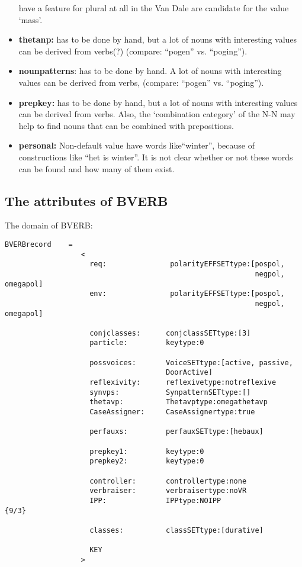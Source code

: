\begin{itemize}
        have a feature for plural at all in the Van Dale are candidate for the 
        value `mass'.
  \item {\bf thetanp:} has to be done by hand, but a lot of nouns with 
        interesting values can be derived from verbs(?) (compare: ``pogen'' vs. 
        ``poging'').
  \item {\bf nounpatterns}: has to be done by hand. A lot of nouns with 
        interesting values can be derived from verbs, (compare: ``pogen'' vs. 
        ``poging'').
  \item {\bf prepkey:} has to be done by hand, but a lot of nouns with 
        interesting values can be derived from verbs. Also, the 
        `combination category' of the N-N may help to find nouns that can 
        be combined with prepositions.
  \item {\bf personal:} Non-default value have words like``winter'', because of 
        constructions like ``het is winter''. It is not clear whether or not 
        these words can be found and how many of them exist.
\end{itemize}

\subsection{The attributes of BVERB}

The domain of BVERB:

\begin{verbatim}
BVERBrecord    =
                  <
                    req:               polarityEFFSETtype:[pospol, 
                                                           negpol, omegapol]
                    env:               polarityEFFSETtype:[pospol, 
                                                           negpol, omegapol]

                    conjclasses:      conjclassSETtype:[3]  
                    particle:         keytype:0  

                    possvoices:       VoiceSETtype:[active, passive, 
                                      DoorActive]     
                    reflexivity:      reflexivetype:notreflexive
                    synvps:           SynpatternSETtype:[]
                    thetavp:          Thetavptype:omegathetavp
                    CaseAssigner:     CaseAssignertype:true

                    perfauxs:         perfauxSETtype:[hebaux]   

                    prepkey1:         keytype:0
                    prepkey2:         keytype:0 

                    controller:       controllertype:none
                    verbraiser:       verbraisertype:noVR               
                    IPP:              IPPtype:NOIPP                        {9/3}

                    classes:          classSETtype:[durative]

                    KEY
                  >
\end{verbatim}

